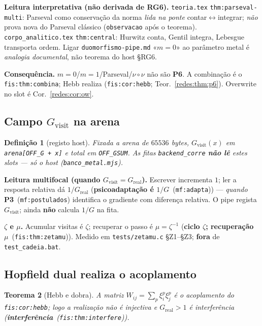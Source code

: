 \documentclass[11pt,a4paper]{article}
\newcommand{\code}[1]{\texttt{\small #1}}
\newcommand{\fis}[2]{\textbf{#2}~\textnormal{(\code{#1})}}
\newcommand{\mf}[2]{\textbf{#2}~\textnormal{(\code{mf:#1})}}
\providecommand{\pt}[1]{\textbf{P#1}}
\newtheorem{teorema}{Teorema}
\newtheorem{definicao}[teorema]{Definição}
\begin{document}
\medskip\noindent\textbf{Leitura interpretativa (não derivada de RG6).}
\code{teoria.tex} \code{thm:parseval-multi}: Parseval como conservação da norma \emph{lida na ponte}
contar$\leftrightarrow$integrar; \emph{não} prova nova do Parseval clássico (\code{observacao}
após o teorema). \code{corpo\_analitico.tex} \code{thm:central}: Hurwitz conta, Gentil integra,
Lebesgue transporta ordem. Ligar \code{duomorfismo-pipe.md} «$m{=}0$» ao parâmetro metal é
\emph{analogia documental}, não teorema do host §RG6.

\medskip\noindent\textbf{Consequência.} $m{=}0$/$m{=}1$/Parseval/$\nu\circ\nu$
não são \pt{6}. A combinação é o \code{fis:thm:combina}; Hebb realiza
(\code{fis:cor:hebb}; Teor.~\ref{redes:thm:p6}). Overwrite no
slot é Cor.~\ref{redes:cor:ow}.

\subsection{Campo $G_{\mathrm{visit}}$ na arena}

\begin{definicao}[registo host]\label{redes:def-gpipe}
Fixada a arena de $65536$ bytes, $G_{\mathrm{visit}}(x)$ em
\code{arena[OFF\_G + x]} e total em \code{OFF\_GSUM}. As fitas \code{backend\_corre}
\textbf{não lê} estes slots --- só o host (\code{banco\_metal.mjs}).
\end{definicao}

\medskip\noindent\textbf{Leitura multifocal (quando $G_{\mathrm{visit}}=G_{\mathrm{real}}$).}
Escrever incrementa $1$; ler a resposta relativa dá $1/G_{\mathrm{real}}$
(\mf{adapta}{psicoadaptação é $1/G$}) --- \emph{quando} \mf{postulados}{P3}
identifica o gradiente com diferença relativa. O pipe regista
$G_{\mathrm{visit}}$; ainda \textbf{não} calcula $1/G$ na fita.

\medskip\noindent\textbf{$\zeta$ e $\mu$.} Acumular visitas é $\zeta$; recuperar o
passo é $\mu=\zeta^{-1}$ (\fis{fis:thm:zetamu}{ciclo $\zeta$; recuperação $\mu$}).
Medido em \code{tests/zetamu.c} §Z1--§Z3; \textbf{fora} de \code{test\_cadeia.bat}.

\subsection{Hopfield dual realiza o acoplamento}\label{redes:hopfield-futuro}

\begin{teorema}[Hebb e dobra]\label{redes:thm-hebb}
A matriz $W_{ij}=\sum_p\xi_i^p\xi_j^p$ é o acoplamento do
\code{fis:cor:hebb}; logo a realização não é injectiva e
$G_{\mathrm{real}}>1$ é interferência (\fis{fis:thm:interfere}{interferência}).
\end{teorema}
\end{document}
